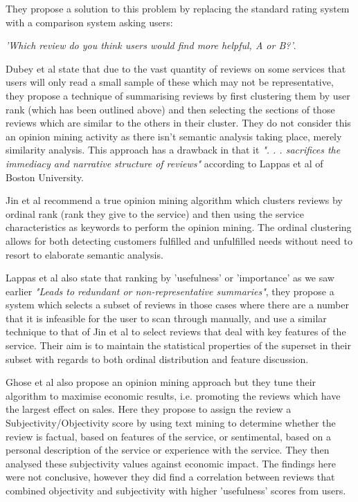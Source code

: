 They propose a solution to this problem by replacing the standard rating system with a comparison system asking users:

\emph{'Which review do you think users would find more helpful, A or B?'}.

Dubey et al\cite{Dubey} state that due to the vast quantity of reviews on some services that users will only read a small sample of these which may not be representative, they propose a technique of summarising reviews by first clustering them by user rank (which has been outlined above) and then selecting the sections of those reviews which are similar to the others in their cluster. They do not consider this an opinion mining activity as there isn't semantic analysis taking place, merely similarity analysis. This approach has a drawback in that it \emph{". . . sacrifices the immediacy and narrative structure of reviews"}\cite{Lappas} according to Lappas et al of Boston University. 

Jin et al\cite{Jin} recommend a true opinion mining algorithm which clusters reviews by ordinal rank (rank they give to the service) and then using the service characteristics as keywords to perform the opinion mining. The ordinal clustering allows for both detecting customers fulfilled and unfulfilled needs without need to resort to elaborate semantic analysis.

Lappas et al\cite{Lappas} also state that ranking by 'usefulness' or 'importance' as we saw earlier \emph{"Leads to redundant or non-representative summaries"}, they propose a system which selects a subset of reviews in those cases where there are a number that it is infeasible for the user to scan through manually, and use a similar technique to that of Jin et al to select reviews that deal with key features of the service. Their aim is to maintain the statistical properties of the superset in their subset with regards to both ordinal distribution and feature discussion.

Ghose et al\cite{Ghose} also propose an opinion mining approach but they tune their algorithm to maximise economic results, i.e. promoting the reviews which have the largest effect on sales. Here they propose to assign the review a Subjectivity/Objectivity score by using text mining to determine whether the review is factual, based on features of the service, or sentimental, based on a personal description of the service or experience with the service. They then analysed these subjectivity values against economic impact. The findings here were not conclusive, however they did find a correlation between reviews that combined objectivity and subjectivity with higher 'usefulness' scores from users.

